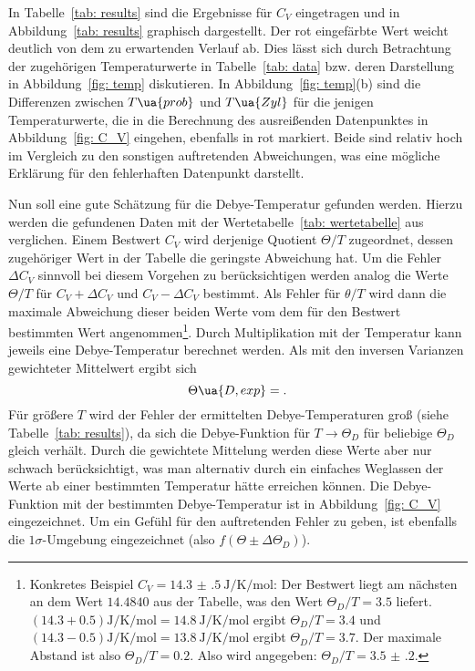 

In Tabelle~\ref{tab: results} sind die Ergebnisse für $C_V$ eingetragen und in Abbildung~\ref{tab: results} graphisch dargestellt.
Der rot eingefärbte Wert weicht deutlich von dem zu erwartenden Verlauf ab. Dies lässt sich durch Betrachtung der
zugehörigen Temperaturwerte in Tabelle~\ref{tab: data} bzw. deren Darstellung in Abbildung~\ref{fig: temp} diskutieren. In Abbildung~\ref{fig: temp}(b)
sind die Differenzen zwischen $T\ua{prob}$ und $T\ua{Zyl}$ für die jenigen Temperaturwerte, die in die Berechnung des
ausreißenden Datenpunktes in Abbildung~\ref{fig: C_V} eingehen, ebenfalls in rot markiert. Beide sind relativ hoch im Vergleich zu den
sonstigen auftretenden Abweichungen, was eine mögliche Erklärung für den fehlerhaften Datenpunkt darstellt.

Nun soll eine gute Schätzung für die Debye-Temperatur gefunden werden. Hierzu werden die gefundenen Daten mit der
Wertetabelle~\ref{tab: wertetabelle} aus~\cite{anleitungV47} verglichen. Einem Bestwert $C_V$ wird derjenige Quotient $\Theta / T$ zugeordnet, dessen
zugehöriger Wert in der Tabelle die geringste Abweichung hat. Um die Fehler $\Delta C_V$ sinnvoll bei diesem
Vorgehen zu berücksichtigen werden analog die Werte $\Theta / T$ für $C_V + \Delta C_V$ und $C_V - \Delta C_V$ bestimmt.
Als Fehler für $\theta / T$ wird dann die maximale Abweichung dieser beiden Werte vom dem für den Bestwert bestimmten
Wert angenommen\footnote{Konkretes Beispiel $C_V = \SI{14.3(5)}{\joule\per\kelvin\per\mol}$:
Der Bestwert liegt am nächsten an dem Wert $\num{14.4840}$ aus der Tabelle, was den Wert $\Theta_D / T = \num{3.5}$ liefert.
$(\num{14.3} + \num{0.5})\si{\joule\per\kelvin\per\mol} = \SI{14.8}{\joule\per\kelvin\per\mol}$ ergibt $\Theta_D / T = \num{3.4}$ und
$(\num{14.3} - \num{0.5})\si{\joule\per\kelvin\per\mol} = \SI{13.8}{\joule\per\kelvin\per\mol}$ ergibt $\Theta_D / T = \num{3.7}$. Der maximale
Abstand ist also $\Theta_D / T = \num{0.2}$. Also wird angegeben: $\Theta_D / T = \num{3.5(2)}$.

}. Durch Multiplikation mit der Temperatur kann jeweils eine Debye-Temperatur berechnet werden.
Als mit den inversen Varianzen gewichteter Mittelwert ergibt sich
\begin{equation}
        \Theta\ua{D, exp} = .
\end{equation}
Für größere $T$ wird der Fehler der ermittelten Debye-Temperaturen groß (siehe Tabelle~\ref{tab: results}), da sich die Debye-Funktion für
$T \rightarrow \Theta_D$ für beliebige $\Theta_D$ gleich verhält. Durch die gewichtete Mittelung werden diese Werte aber nur schwach
berücksichtigt, was man alternativ durch ein einfaches Weglassen der Werte ab einer bestimmten Temperatur hätte erreichen können.
Die Debye-Funktion mit der bestimmten Debye-Temperatur ist in Abbildung~\ref{fig: C_V} eingezeichnet. Um ein Gefühl für den
auftretenden Fehler zu geben, ist ebenfalls die $1\sigma$-Umgebung eingezeichnet (also $f(\Theta \pm \Delta\Theta_D)$).

